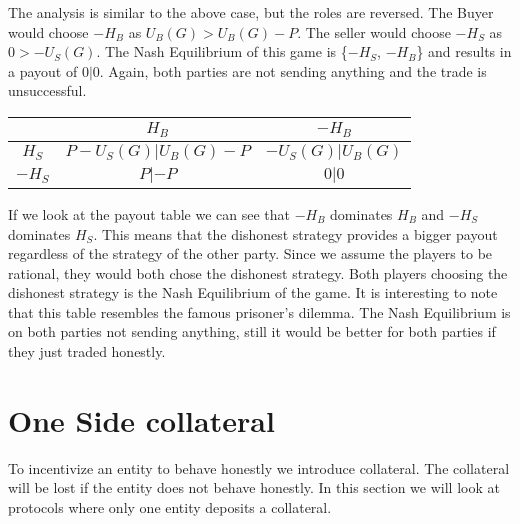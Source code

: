 \documentclass{cacthesis}
\begin{document}
\newline
The analysis is similar to the above case, but the roles are reversed. The Buyer would choose $-H_B$ as $U_B(G) > U_B(G)-P$.\newline
The seller would choose $-H_S$ as $0 > -U_S(G)$.\newline
The Nash Equilibrium of this game is \{$-H_S$, $-H_B$\} and results in a payout of $0|0$. Again, both parties are not sending anything and the trade is unsuccessful.


\begin{center}
\begin{tabular}{ c||c|c| }
& $H_B$ & $-H_B$  \\
\hline
\hline
$H_S$ & $P - U_S(G)|U_B(G) - P$ & $-U_S(G) | U_B(G)$ \\
\hline
$-H_S$ & $P |-P$ & $0 | 0$ \\ 
\hline
\end{tabular}
\end{center}

If we look at the payout table we can see that $-H_B$ dominates $H_B$ and $-H_S$ dominates $H_S$. This means that the dishonest strategy provides a bigger payout regardless of the strategy of the other party. \newline
Since we assume the players to be rational, they would both chose the dishonest strategy. Both players choosing the dishonest strategy is the Nash Equilibrium of the game.\newline
It is interesting to note that this table resembles the famous prisoner's dilemma.
The Nash Equilibrium is on both parties not sending anything, still it would be better for both parties if they just traded honestly. 

\section{One Side collateral}
To incentivize an entity to behave honestly we introduce collateral. The collateral will be lost if the entity does not behave honestly. In this section we will look at protocols where only one entity deposits a collateral.
\end{document}
